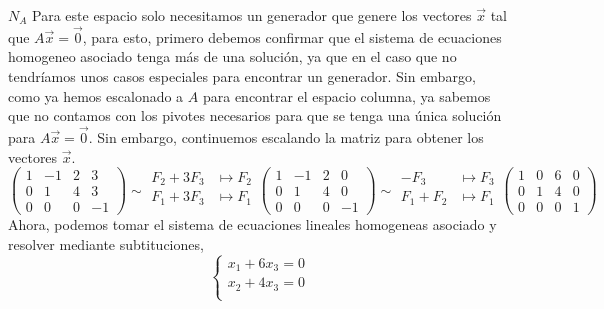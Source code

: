     \begin{mathcase}{\(N_A\)}
        Para este espacio solo necesitamos un generador que genere los vectores \(\vec{x}\) tal que \(A\vec{x} = \vec{0}\), para esto, primero debemos confirmar 
        que el sistema de ecuaciones homogeneo asociado tenga más de una solución, ya que en el caso que no tendríamos unos casos especiales para encontrar un generador.
        Sin embargo, como ya hemos escalonado a \(A\) para encontrar el espacio columna, ya sabemos que no contamos con los pivotes necesarios para que se tenga una única solución 
        para \(A\vec{x} = \vec{0}\). Sin embargo, continuemos escalando la matriz para obtener los vectores \(\vec{x}\).
        \[
            \begin{pmatrix}
                1 & -1 & 2 & 3 \\
                0 & 1 & 4 & 3 \\
                0 & 0 & 0 & -1
            \end{pmatrix}
            \sim
            \begin{aligned}
                F_2 + 3F_3 &\mapsto F_2 \\
                F_1 + 3F_3 &\mapsto F_1 \\
            \end{aligned}
            \begin{pmatrix}
                1 & -1 & 2 & 0 \\
                0 & 1 & 4 & 0 \\
                0 & 0 & 0 & -1
            \end{pmatrix}
            \sim
            \begin{aligned}
                -F_3 &\mapsto F_3 \\
                F_1 + F_2 &\mapsto F_1 \\
            \end{aligned}
            \begin{pmatrix}
                1 & 0 & 6 & 0 \\
                0 & 1 & 4 & 0 \\
                0 & 0 & 0 & 1
            \end{pmatrix}
        \]
        Ahora, podemos tomar el sistema de ecuaciones lineales homogeneas asociado y resolver mediante subtituciones,
        \[
            \left\{
                \begin{aligned}
                    x_1 + 6x_3 = 0 \\
                    x_2 + 4x_3 = 0 \\

\end{aligned}\]
\end{mathcase}
